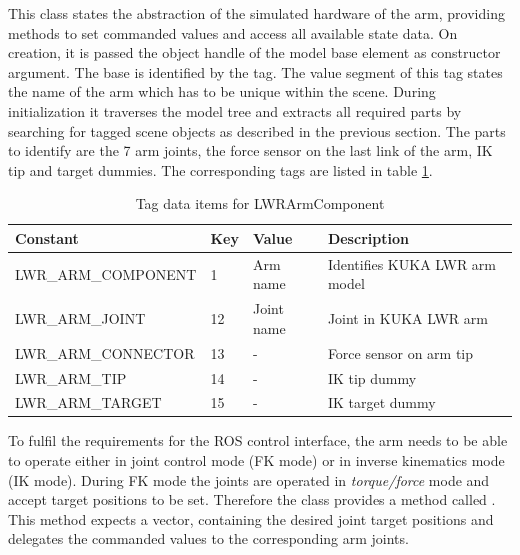 This class states the abstraction of the simulated hardware of the arm, providing methods to set commanded values and access all available state data. On creation, it is passed the object handle of the model base element as constructor argument. The base is identified by the  tag. The value segment of this tag states the name of the arm which has to be unique within the scene. During initialization it traverses the model tree and extracts all required parts by searching for tagged scene objects as described in the previous section. The parts to identify are the 7 arm joints, the force sensor on the last link of the arm, IK tip and target dummies. The corresponding tags are listed in table \ref{fig:lwr_tags}. \\

\begin{table}[ht]
  \centering
  \begin{tabularx}{\textwidth}{|l|l|l|X|} \hline
	\textbf{Constant} & \textbf{Key} & \textbf{Value} & \textbf{Description} \\ \hline
	LWR\_ARM\_COMPONENT & 1 & Arm name & Identifies KUKA LWR arm model \\
	LWR\_ARM\_JOINT & 12 & Joint name & Joint in KUKA LWR arm \\
	LWR\_ARM\_CONNECTOR & 13 & - & Force sensor on arm tip \\
	LWR\_ARM\_TIP & 14 & - & IK tip dummy \\
	LWR\_ARM\_TARGET & 15 & - & IK target dummy  \\ \hline
  \end{tabularx}
  \caption{Tag data items for LWRArmComponent}
  \label{fig:lwr_tags}
\end{table}

To fulfil the requirements for the ROS control interface, the arm needs to be able to operate either in joint control mode (FK mode) or in inverse kinematics mode (IK mode). During FK mode the joints are operated in \emph{torque/force} mode and accept target positions to be set. Therefore the  class provides a method called . This method expects a vector, containing the desired joint target positions and delegates the commanded values to the corresponding arm joints. \\

